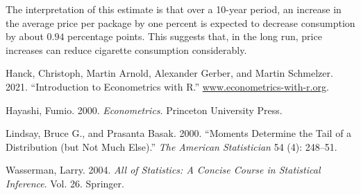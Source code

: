 \documentclass[
  letterpaper,
  DIV=11,
  numbers=noendperiod]{scrreprt}
\newlength{\cslhangindent}
\newlength{\cslentryspacingunit} %
\newenvironment{CSLReferences}[2] %
 {%
  \setlength{\parindent}{0pt}
  \ifodd #1
  \let\oldpar\par
  \def\par{\hangindent=\cslhangindent\oldpar}
  \fi
  \setlength{\parskip}{#2\cslentryspacingunit}
 }%
 {}
\theoremstyle{definition}
\theoremstyle{plain}
\theoremstyle{plain}
\theoremstyle{remark}
\begin{document}
{The interpretation of this estimate is that over a 10-year period, an
increase in the average price per package by one percent is expected to
decrease consumption by about \(0.94\) percentage points. This suggests
that, in the long run, price increases can reduce cigarette consumption
considerably.

\hypertarget{refs}{}
\begin{CSLReferences}{1}{0}
\leavevmode{}%
Hanck, Christoph, Martin Arnold, Alexander Gerber, and Martin Schmelzer.
2021. {``Introduction to Econometrics with {R}.''}
\href{https://www.econometrics-with-r.org}{www.econometrics-with-r.org}.

\leavevmode{}%
Hayashi, Fumio. 2000. \emph{Econometrics}. Princeton University Press.

\leavevmode{}%
Lindsay, Bruce G., and Prasanta Basak. 2000. {``Moments Determine the
Tail of a Distribution (but Not Much Else).''} \emph{The American
Statistician} 54 (4): 248--51.

\leavevmode{}%
Wasserman, Larry. 2004. \emph{All of Statistics: A Concise Course in
Statistical Inference}. Vol. 26. Springer.

\end{CSLReferences}
\end{document}
